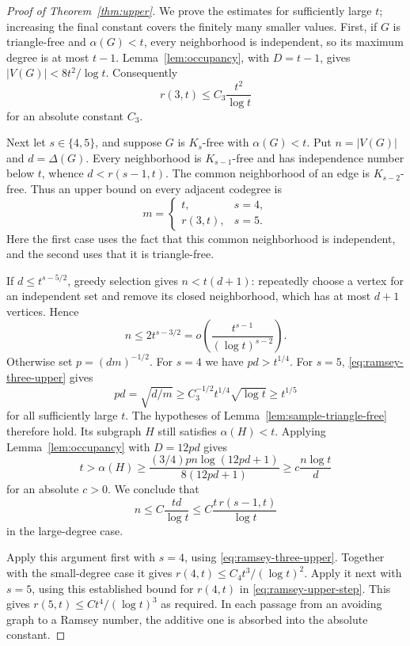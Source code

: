 \begin{proof}[Proof of Theorem~\ref{thm:upper}]
We prove the estimates for sufficiently large $t$; increasing the final
constant covers the finitely many smaller values.
First, if $G$ is triangle-free and $\alpha(G)<t$, every neighborhood is
independent, so its maximum degree is at most $t-1$.
Lemma~\ref{lem:occupancy}, with $D=t-1$, gives
$|V(G)|<8t^2/\log t$.  Consequently
\begin{equation}\label{eq:ramsey-three-upper}
 r(3,t)\le C_3\frac{t^2}{\log t}
\end{equation}
for an absolute constant $C_3$.

Next let $s\in\{4,5\}$, and suppose $G$ is $K_s$-free with
$\alpha(G)<t$.  Put $n=|V(G)|$ and $d=\Delta(G)$.
Every neighborhood is $K_{s-1}$-free and has independence number below
$t$, whence $d<r(s-1,t)$.  The common neighborhood of an edge is
$K_{s-2}$-free.  Thus an upper bound on every adjacent codegree is
\[
 m=\begin{cases}
 t,&s=4,\\
 r(3,t),&s=5.
 \end{cases}
\]
Here the first case uses the fact that this common neighborhood is
independent, and the second uses that it is triangle-free.

If $d\le t^{s-5/2}$, greedy selection gives $n<t(d+1)$: repeatedly choose
a vertex for an independent set and remove its closed neighborhood,
which has at most $d+1$ vertices.  Hence
\[
 n\le2t^{s-3/2}
 =o\!\left(\frac{t^{s-1}}{(\log t)^{s-2}}\right).
\]
Otherwise set $p=(dm)^{-1/2}$.  For $s=4$ we have $pd>t^{1/4}$.
For $s=5$, \eqref{eq:ramsey-three-upper} gives
\[
 pd=\sqrt{d/m}
 \ge C_3^{-1/2}t^{1/4}\sqrt{\log t}\ge t^{1/5}
\]
for all sufficiently large $t$.
The hypotheses of Lemma~\ref{lem:sample-triangle-free} therefore hold.
Its subgraph $H$ still satisfies $\alpha(H)<t$.
Applying Lemma~\ref{lem:occupancy} with $D=12pd$ gives
\[
 t>\alpha(H)
 \ge\frac{(3/4)pn\log(12pd+1)}{8(12pd+1)}
 \ge c\frac{n\log t}{d}
\]
for an absolute $c>0$.  We conclude that
\begin{equation}\label{eq:ramsey-upper-step}
 n\le C\frac{td}{\log t}
 \le C\frac{t\,r(s-1,t)}{\log t}
\end{equation}
in the large-degree case.

Apply this argument first with $s=4$, using
\eqref{eq:ramsey-three-upper}.  Together with the small-degree case it
gives $r(4,t)\le C_4t^3/(\log t)^2$.
Apply it next with $s=5$, using this established bound for $r(4,t)$ in
\eqref{eq:ramsey-upper-step}.  This gives
$r(5,t)\le Ct^4/(\log t)^3$ as required.
In each passage from an avoiding graph to a Ramsey number, the
additive one is absorbed into the absolute constant.
\end{proof}
